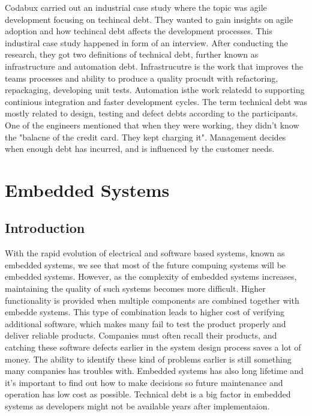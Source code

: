 Codabux carried out an industrial case study where the topic was agile development focusing on techincal debt. They wanted to gain insights on agile adoption and how techincal debt affects the development processes. This industiral case study happened in form of an interview. After conducting the research, they got two definitions of technical debt, further known as infrastructure and automation debt. Infrastrucutre is the work that improves the teams processes and ability to produce a quality procudt with refactoring, repackaging, developing unit tests. Automation isthe work relatedd to supporting continious integration and faster development cycles. The term technical debt was mostly related to design, testing and defect debts according to the participants. One of the engineers mentioned that when they were working, they didn't know the "balacne of the credit card. They kept charging it". Management decides when enough debt has incurred, and is influenced by the customer needs.











\chapter{Embedded Systems}
\section{Introduction}
With the rapid evolution of electrical and software based systems, known as embedded systems, we see that most of the future compuing systems will be embedded systems\cite{wolfmadsen-2000}. However, as the complexity of embedded systems increases, maintaining the quality of such systems becomes more difficult. Higher functionality is provided when multiple components are combined together with embedde systems. This type of combination leads to higher cost of verifying additional software, which makes many fail to test the product properly and deliver reliable products. Companies must often recall their products, and catching these software defects earlier in the system design process saves a lot of money. The ability to identify these kind of problems earlier is still something many companies has troubles with. Embedded systems has also long lifetime and it's important to find out how to make decisions so future maintenance and operation has low cost as possible. Technical debt is a big factor in embedded systems as developers might not be available years after implementaion. 

